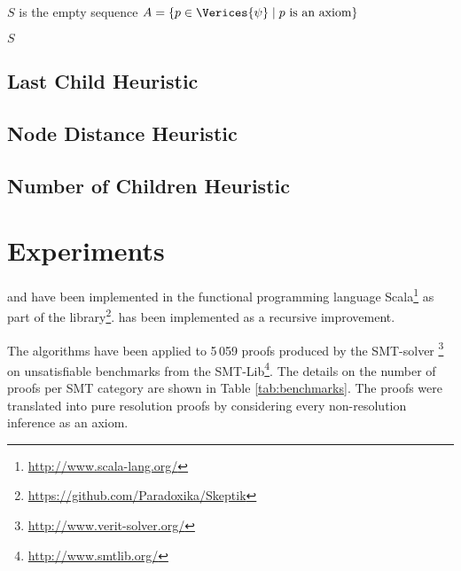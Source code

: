 \documentclass{llncs}
\begin{document}
\begin{algorithm}[h]
	
	$S$ is the empty sequence\;
	$A = \{p \in \Verices{\psi} \mid p \text{ is an axiom}\}$\;
	
	
	\Return $S$\;
	
  \caption[.]{}
  \label{algo:TDpebbling}
\end{algorithm}

\subsection{Last Child Heuristic}

\subsection{Node Distance Heuristic}

\subsection{Number of Children Heuristic}




\section{Experiments} \label{sec:exp}

{\LowerUnivalents} and {\LUnivRPI} have been implemented in the functional programming
language Scala\footnote{\url{http://www.scala-lang.org/}} as part of the \skeptik
library\footnote{\url{https://github.com/Paradoxika/Skeptik}}. {\LowerUnivalents} has been implemented as a
recursive  improvement.

The algorithms have been applied to 5\,059 proofs produced by the SMT-solver
{\veriT}\footnote{\url{http://www.verit-solver.org/}} on unsatisfiable benchmarks from the
SMT-Lib\footnote{\url{http://www.smtlib.org/}}.  The details on the number of proofs per SMT category
are shown in Table \ref{tab:benchmarks}.  The proofs were translated into pure resolution proofs by
considering every non-resolution inference as an axiom.
\end{document}
